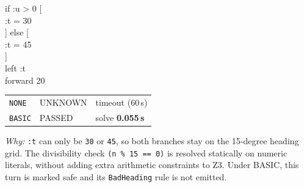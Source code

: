 \hfill
\begin{minipage}[t]{0.50\linewidth}
\vspace{0pt}
\colorbox{gray!12}{%
  \begin{minipage}{\linewidth}
    \ttfamily\small
    if :u > 0 [ \\
    \hspace*{1.2em}:t = 30 \\
    ] else [ \\
    \hspace*{1.2em}:t = 45 \\
    ] \\
    left :t \\
    forward 20
  \end{minipage}%
}

\vspace{0.8em}
\begin{tabular}{@{}lll@{}}
\texttt{NONE}  & \textcolor{orange!80!black}{UNKNOWN} & timeout (60\,s) \\
\texttt{BASIC} & \textcolor{green!60!black}{PASSED}  & solve \textbf{0.055\,s} \\
\end{tabular}

\vspace{0.6em}
\small\textit{Why:} \texttt{:t} can only be \texttt{30} or \texttt{45}, so both branches stay on the 15-degree heading grid. The divisibility check \texttt{(n \% 15 == 0)} is resolved statically on numeric literals, without adding extra arithmetic constraints to Z3. Under BASIC, this turn is marked safe and its \texttt{BadHeading} rule is not emitted.
\end{minipage}


